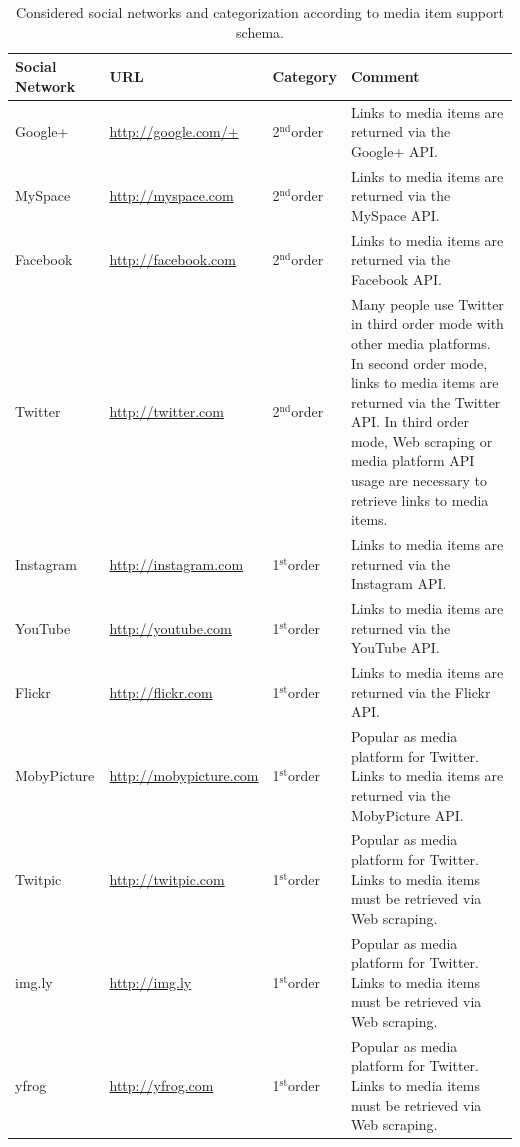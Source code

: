 \documentclass{acm_proc_article-sp}
\newcommand{\superscript}[1]{\ensuremath{^{\textrm{#1}}}}
\newcommand{\st}[0]{\superscript{st}}
\newcommand{\nd}[0]{\superscript{nd}}
\newcommand{\inlinelistingsize}{\fontsize{8pt}{11pt}}
\let\oldurl\url
\renewcommand{\url}[1]{\inlinelistingsize\oldurl{#1}}
\begin{document}
\begin{table}[htbp]
  \begin{tabular}{ | l | l | l | p{8cm} |}
    \hline
    \textbf{Social Network} & \textbf{URL} & \textbf{Category} & \textbf{Comment}\\
    \hline
	Google+ & \url{http://google.com/+} & 2\nd order & Links to media items are returned via the Google+ API.\\\hline
	MySpace & \url{http://myspace.com} & 2\nd order & Links to media items are returned via the MySpace API.\\\hline
	Facebook & \url{http://facebook.com} & 2\nd order & Links to media items are returned via the Facebook API.\\\hline
	Twitter & \url{http://twitter.com} & 2\nd order & Many people use Twitter in third order mode with other media platforms. In second order mode, links to media items are returned via the Twitter API. In third order mode, Web scraping or media platform API usage are necessary to retrieve links to media items.\\\hline
	Instagram & \url{http://instagram.com} & 1\st order & Links to media items are returned via the Instagram API.\\\hline
	YouTube & \url{http://youtube.com} & 1\st order & Links to media items are returned via the YouTube API.\\\hline
	Flickr & \url{http://flickr.com} & 1\st order & Links to media items are returned via the Flickr API.\\\hline
	MobyPicture & \url{http://mobypicture.com} & 1\st order & Popular as media platform for Twitter. Links to media items are returned via the MobyPicture API.\\\hline
	Twitpic & \url{http://twitpic.com} & 1\st order & Popular as media platform for Twitter. Links to media items must be retrieved via Web scraping.\\\hline
	img.ly & \url{http://img.ly} & 1\st order & Popular as media platform for Twitter. Links to media items must be retrieved via Web scraping.\\\hline
	yfrog & \url{http://yfrog.com} & 1\st order & Popular as media platform for Twitter.   Links to media items must be retrieved via Web scraping.\\
	\hline
  \end{tabular}
  \label{tab:networks}
  \caption{Considered social networks and categorization according to media item support schema.}
\end{table}
\end{document}
